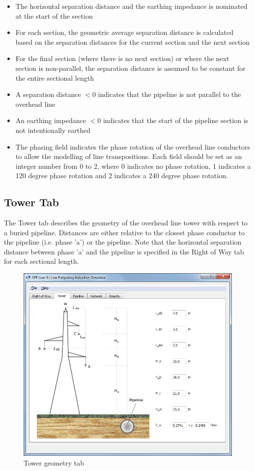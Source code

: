 \documentclass{article}
\begin{document}
\begin{itemize}
\item The horizontal separation distance and the earthing impedance is nominated at the start of the section
\item For each section, the geometric average separation distance is calculated based on the separation distances for the current section and the next section
\item For the final section (where there is no next section) or where the next section is non-parallel, the separation distance is assumed to be constant for the entire sectional length
\item A separation distance $<$0 indicates that the pipeline is not parallel to the overhead line
\item An earthing impedance $<$0 indicates that the start of the pipeline section is not intentionally earthed
\item The phasing field indicates the phase rotation of the overhead line conductors to allow the modelling of line transpositions. Each field should be set as an integer number from 0 to 2, where 0 indicates no phase rotation, 1 indicates a 120 degree phase rotation and 2 indicates a 240 degree phase rotation. 
\end{itemize}

\subsection{Tower Tab}
The Tower tab describes the geometry of the overhead line tower with respect to a buried pipeline. Distances are either relative to the closest phase conductor to the pipeline (i.e. phase 'a') or the pipeline. Note that the horizontal separation distance between phase 'a' and the pipeline is specified in the Right of Way tab for each sectional length.

\begin{figure}[!htp]
\begin{center}
\caption{Tower geometry tab}
\label{fig:tower}
\includegraphics[width=0.9\linewidth]{./Figures/tower_geometry.png}
\end{center}
\end{figure}
\end{document}
